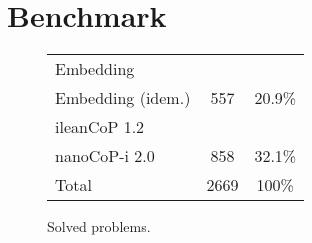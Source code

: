 \documentclass[runningheads]{llncs}
\begin{document}
\section{Benchmark}

\begin{wrapfigure}[6]{r}{0.4\textwidth}
		\vspace*{-1.7cm}
		\begin{tabular}{l|c|c}
			Embedding&&\\
			 Embedding (idem.)&557&20.9\%\\
			ileanCoP 1.2&&\\
			nanoCoP-i 2.0&858&32.1\%\\\hline
			Total&2669&100\%
		\end{tabular}
		\caption{Solved problems.}
		\label{fig:a}
\end{wrapfigure}
\end{document}
